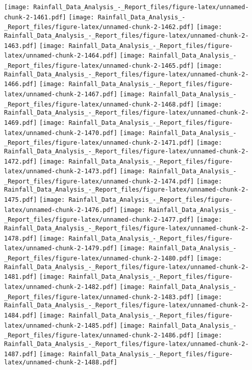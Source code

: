 \documentclass[
]{article}
\begin{document}
\texttt{[image: Rainfall\_Data\_Analysis\_-\_Report\_files/figure-latex/unnamed-chunk-2-1461.pdf]}
\texttt{[image: Rainfall\_Data\_Analysis\_-\_Report\_files/figure-latex/unnamed-chunk-2-1462.pdf]}
\texttt{[image: Rainfall\_Data\_Analysis\_-\_Report\_files/figure-latex/unnamed-chunk-2-1463.pdf]}
\texttt{[image: Rainfall\_Data\_Analysis\_-\_Report\_files/figure-latex/unnamed-chunk-2-1464.pdf]}
\texttt{[image: Rainfall\_Data\_Analysis\_-\_Report\_files/figure-latex/unnamed-chunk-2-1465.pdf]}
\texttt{[image: Rainfall\_Data\_Analysis\_-\_Report\_files/figure-latex/unnamed-chunk-2-1466.pdf]}
\texttt{[image: Rainfall\_Data\_Analysis\_-\_Report\_files/figure-latex/unnamed-chunk-2-1467.pdf]}
\texttt{[image: Rainfall\_Data\_Analysis\_-\_Report\_files/figure-latex/unnamed-chunk-2-1468.pdf]}
\texttt{[image: Rainfall\_Data\_Analysis\_-\_Report\_files/figure-latex/unnamed-chunk-2-1469.pdf]}
\texttt{[image: Rainfall\_Data\_Analysis\_-\_Report\_files/figure-latex/unnamed-chunk-2-1470.pdf]}
\texttt{[image: Rainfall\_Data\_Analysis\_-\_Report\_files/figure-latex/unnamed-chunk-2-1471.pdf]}
\texttt{[image: Rainfall\_Data\_Analysis\_-\_Report\_files/figure-latex/unnamed-chunk-2-1472.pdf]}
\texttt{[image: Rainfall\_Data\_Analysis\_-\_Report\_files/figure-latex/unnamed-chunk-2-1473.pdf]}
\texttt{[image: Rainfall\_Data\_Analysis\_-\_Report\_files/figure-latex/unnamed-chunk-2-1474.pdf]}
\texttt{[image: Rainfall\_Data\_Analysis\_-\_Report\_files/figure-latex/unnamed-chunk-2-1475.pdf]}
\texttt{[image: Rainfall\_Data\_Analysis\_-\_Report\_files/figure-latex/unnamed-chunk-2-1476.pdf]}
\texttt{[image: Rainfall\_Data\_Analysis\_-\_Report\_files/figure-latex/unnamed-chunk-2-1477.pdf]}
\texttt{[image: Rainfall\_Data\_Analysis\_-\_Report\_files/figure-latex/unnamed-chunk-2-1478.pdf]}
\texttt{[image: Rainfall\_Data\_Analysis\_-\_Report\_files/figure-latex/unnamed-chunk-2-1479.pdf]}
\texttt{[image: Rainfall\_Data\_Analysis\_-\_Report\_files/figure-latex/unnamed-chunk-2-1480.pdf]}
\texttt{[image: Rainfall\_Data\_Analysis\_-\_Report\_files/figure-latex/unnamed-chunk-2-1481.pdf]}
\texttt{[image: Rainfall\_Data\_Analysis\_-\_Report\_files/figure-latex/unnamed-chunk-2-1482.pdf]}
\texttt{[image: Rainfall\_Data\_Analysis\_-\_Report\_files/figure-latex/unnamed-chunk-2-1483.pdf]}
\texttt{[image: Rainfall\_Data\_Analysis\_-\_Report\_files/figure-latex/unnamed-chunk-2-1484.pdf]}
\texttt{[image: Rainfall\_Data\_Analysis\_-\_Report\_files/figure-latex/unnamed-chunk-2-1485.pdf]}
\texttt{[image: Rainfall\_Data\_Analysis\_-\_Report\_files/figure-latex/unnamed-chunk-2-1486.pdf]}
\texttt{[image: Rainfall\_Data\_Analysis\_-\_Report\_files/figure-latex/unnamed-chunk-2-1487.pdf]}
\texttt{[image: Rainfall\_Data\_Analysis\_-\_Report\_files/figure-latex/unnamed-chunk-2-1488.pdf]}
\end{document}
